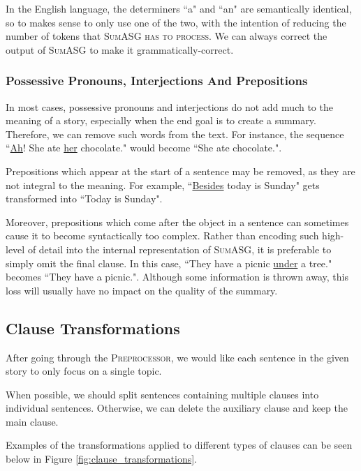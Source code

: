 In the English language, the determiners ``a" and ``an" are semantically identical, so to makes sense to only use one of the two, with the intention of reducing the number of tokens that \textsc{SumASG has to process}. We can always correct the output of \textsc{SumASG} to make it grammatically-correct.

\subsubsection{Possessive Pronouns, Interjections And Prepositions}

In most cases, possessive pronouns and interjections do not add much to the meaning of a story, especially when the end goal is to create a summary. Therefore, we can remove such words from the text. For instance, the sequence ``\underline{Ah}! She ate \underline{her} chocolate." would become ``She ate chocolate.".

Prepositions which appear at the start of a sentence may be removed, as they are not integral to the meaning. For example, ``\underline{Besides} today is Sunday" gets transformed into ``Today is Sunday".

Moreover, prepositions which come after the object in a sentence can sometimes cause it to become syntactically too complex. Rather than encoding such high-level of detail into the internal representation of \textsc{SumASG}, it is preferable to simply omit the final clause. In this case, ``They have a picnic \underline{under} a tree." becomes ``They have a picnic.". Although some information is thrown away, this loss will usually have no impact on the quality of the summary.

\subsection{Clause Transformations}

After going through the \textsc{Preprocessor}, we would like each sentence in the given story to only focus on a single topic.

When possible, we should split sentences containing multiple clauses into individual sentences. Otherwise, we can delete the auxiliary clause and keep the main clause.

Examples of the transformations applied to different types of clauses can be seen below in Figure \ref{fig:clause_transformations}.

